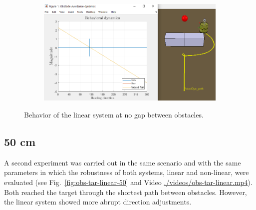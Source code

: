 \begin{figure}[htb!]
\begin{subfigure}{.45\textwidth}
  \caption{}%
  \label{fig:obs-tar-linear-behavioral-5}
  \end{subfigure}
  \begin{subfigure}{.45\textwidth}
    \includegraphics[width=\textwidth]{img/4-7.PNG}%
  \caption{}%
  \label{fig:obs-tar-linear-behavioral-6}
  \end{subfigure}
  \caption{Behavior of the linear system at no gap between obstacles.}%
  \label{fig:obs-tar-linear-behavioral}
\end{figure}

\subsection{50 cm}%
\label{sec:no-gap-linear-50}
A second experiment was carried out in the same scenario and with the same
parameters in which the robustness of both systems, linear and non-linear, were
evaluated (see Fig.~\ref{fig:obs-tar-linear-50} and Video \href{run:./videos/obs-tar-linear.mp4}{./videos/obs-tar-linear.mp4}). 
Both reached the target through the shortest path between obstacles. However,
the linear system showed more abrupt direction adjustments.

